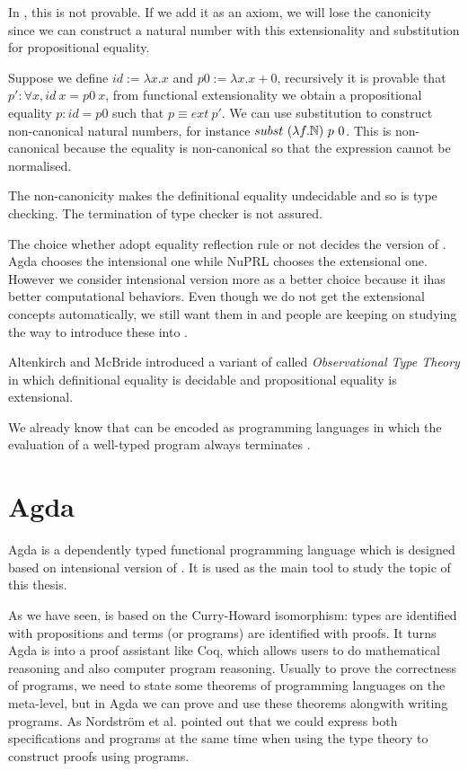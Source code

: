 In \itt, this is not provable. If we add it as an axiom, we will lose the canonicity since we can construct a natural number with this extensionality and substitution for propositional equality.

\begin{example}
Suppose we define $id := \lambda x . x$ and $p0 := \lambda x . x + 0$, recursively it is provable that $p': \forall x , id~ x = p0~x$, from functional extensionality we obtain a propositional equality $p: id = p0$ such that $p \equiv ext ~p'$. We can use substitution to construct non-canonical natural numbers, for instance $subst~ (\lambda f. \mathbb{N}) ~p ~0$. This is non-canonical because the equality is non-canonical so that the expression cannot be normalised.
\end{example}


The non-canonicity makes the definitional equality undecidable and so is type checking. The termination of type checker is not assured.


The choice whether adopt equality reflection rule or not decides the version of \mltt. Agda chooses the intensional one while NuPRL chooses the extensional one.  However we consider intensional version more as a better choice because it ihas better computational behaviors. Even though we do not get the extensional concepts automatically, we still want them in \itt and people are keeping on studying the way to introduce these into \itt.

Altenkirch and McBride introduced a variant of \ett called
\emph{Observational Type Theory}  \cite{alt:06} in which definitional equality is
decidable and propositional equality is extensional.


We already know that \mltt can be encoded as programming languages in
which the evaluation of a well-typed program always terminates \cite{nor:90}.


\section{Agda}

Agda is a dependently typed functional programming language which is designed based on intensional version
of \mltt \cite{agdawiki:main}. It is used as the main tool to study the topic of this thesis.

As we have seen, \mltt is based on the Curry-Howard
isomorphism: types are identified with propositions and terms (or programs) are identified with proofs. It turns Agda is into a proof assistant like Coq, which allows users to do mathematical reasoning and also computer program reasoning. 
Usually to prove the correctness of programs, we need to state some theorems of programming languages on the meta-level, but in Agda we can prove and use these theorems alongwith writing programs.  As Nordström et al. \cite{nps} pointed out that we could express both specifications and programs at the same time when using the type theory to construct proofs using programs.


